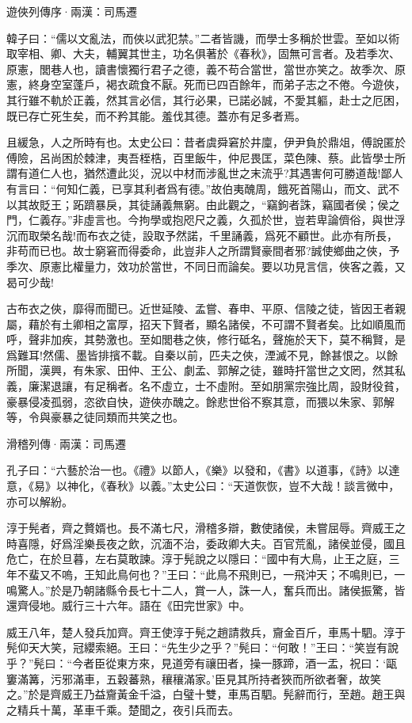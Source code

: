 \documentclass[12pt,a4paper]{ctexbook}
\begin{document}
遊俠列傳序·兩漢：司馬遷 \par
韓子曰：“儒以文亂法，而俠以武犯禁。”二者皆譏，而學士多稱於世雲。至如以術取宰相、卿、大夫，輔翼其世主，功名俱著於《春秋》，固無可言者。及若季次、原憲，閭巷人也，讀書懷獨行君子之德，義不苟合當世，當世亦笑之。故季次、原憲，終身空室蓬戶，褐衣疏食不厭。死而已四百餘年，而弟子志之不倦。今遊俠，其行雖不軌於正義，然其言必信，其行必果，已諾必誠，不愛其軀，赴士之厄困，既已存亡死生矣，而不矜其能。羞伐其德。蓋亦有足多者焉。\par
且緩急，人之所時有也。太史公曰：昔者虞舜窘於井廩，伊尹負於鼎俎，傅說匿於傅險，呂尚困於棘津，夷吾桎梏，百里飯牛，仲尼畏匡，菜色陳、蔡。此皆學士所謂有道仁人也，猶然遭此災，況以中材而涉亂世之末流乎?其遇害何可勝道哉!鄙人有言曰：“何知仁義，已享其利者爲有德。”故伯夷醜周，餓死首陽山，而文、武不以其故貶王；跖躋暴戾，其徒誦義無窮。由此觀之，“竊鉤者誅，竊國者侯；侯之門，仁義存。”非虛言也。今拘學或抱咫尺之義，久孤於世，豈若卑論儕俗，與世浮沉而取榮名哉!而布衣之徒，設取予然諾，千里誦義，爲死不顧世。此亦有所長，非苟而已也。故士窮窘而得委命，此豈非人之所謂賢豪間者邪?誠使鄉曲之俠，予季次、原憲比權量力，效功於當世，不同日而論矣。要以功見言信，俠客之義，又曷可少哉!\par
古布衣之俠，靡得而聞已。近世延陵、孟嘗、春申、平原、信陵之徒，皆因王者親屬，藉於有土卿相之富厚，招天下賢者，顯名諸侯，不可謂不賢者矣。比如順風而呼，聲非加疾，其勢激也。至如閭巷之俠，修行砥名，聲施於天下，莫不稱賢，是爲難耳!然儒、墨皆排擯不載。自秦以前，匹夫之俠，湮滅不見，餘甚恨之。以餘所聞，漢興，有朱家、田仲、王公、劇孟、郭解之徒，雖時扞當世之文罔，然其私義，廉潔退讓，有足稱者。名不虛立，士不虛附。至如朋黨宗強比周，設財役貧，豪暴侵凌孤弱，恣欲自快，遊俠亦醜之。餘悲世俗不察其意，而猥以朱家、郭解等，令與豪暴之徒同類而共笑之也。\par
滑稽列傳·兩漢：司馬遷 \par
孔子曰：“六藝於治一也。《禮》以節人，《樂》以發和，《書》以道事，《詩》以達意，《易》以神化，《春秋》以義。”太史公曰：“天道恢恢，豈不大哉！談言微中，亦可以解紛。\par
淳于髡者，齊之贅婿也。長不滿七尺，滑稽多辯，數使諸侯，未嘗屈辱。齊威王之時喜隱，好爲淫樂長夜之飲，沉湎不治，委政卿大夫。百官荒亂，諸侯並侵，國且危亡，在於旦暮，左右莫敢諫。淳于髡說之以隱曰：“國中有大鳥，止王之庭，三年不蜚又不嗚，王知此鳥何也？”王曰：“此鳥不飛則已，一飛沖天；不鳴則已，一鳴驚人。”於是乃朝諸縣令長七十二人，賞一人，誅一人，奮兵而出。諸侯振驚，皆還齊侵地。威行三十六年。語在《田完世家》中。\par
威王八年，楚人發兵加齊。齊王使淳于髡之趙請救兵，齎金百斤，車馬十駟。淳于髡仰天大笑，冠纓索絕。王曰：“先生少之乎？”髡曰：“何敢！”王曰：“笑豈有說乎？”髡曰：“今者臣從東方來，見道旁有禳田者，操一豚蹄，酒一盂，祝曰：‘甌窶滿篝，污邪滿車，五穀蕃熟，穰穰滿家。’臣見其所持者狹而所欲者奢，故笑之。”於是齊威王乃益齎黃金千溢，白璧十雙，車馬百駟。髡辭而行，至趙。趙王與之精兵十萬，革車千乘。楚聞之，夜引兵而去。\par
\end{document}
